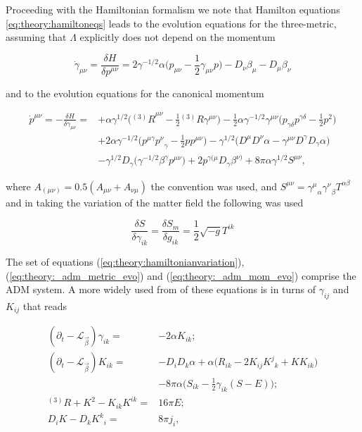 \documentclass[11pt,a4paper,headinclude=true,DIV=14,BCOR=8mm,chapterprefix,listof=totoc,twoside,openright,abstracton]{scrbook}
\begin{document}
Proceeding with the Hamiltonian formalism we note that Hamilton equations \ref{eq:theory:hamiltoneqs} leads to the evolution equations for the three-metric, assuming that $\Lambda$ explicitly does not depend on the momentum

\begin{equation}
\dot{\gamma}_{\mu\nu} =\frac{\delta H}{\delta p^{\mu\nu}} = 2\gamma^{-1/2}\alpha\big(p_{\mu\nu}-\frac{1}{2}\gamma_{\mu\nu}p\big) - D_{\nu}\beta_{\mu}-D_{\mu}\beta_{\nu}
\label{eq:theory:_adm_metric_evo}
\end{equation}

and to the evolution equations for the canonical momentum 

\begin{align}
\dot{p}^{\mu\nu} = -\frac{\delta H}{\delta \gamma_{\mu\nu}} = &+ \alpha\gamma^{1/2}\Big({^{(3)}R}^{\mu\nu}-\frac{1}{2}{^{(3)}R\gamma^{\mu\nu}}\Big) 
 - \frac{1}{2}\alpha\gamma^{-1/2}\gamma^{\mu\nu}\Big(p_{\gamma\delta}p^{\gamma\delta}-\frac{1}{2}p^2\Big) \\
& + 2\alpha\gamma^{-1/2}\big(p^{\mu\gamma}{p^{\nu}}_{\gamma}-\frac{1}{2}pp^{\mu\nu}\big) 
 - \gamma^{1/2}\big(D^{\mu}D^{\nu}\alpha-\gamma^{\mu\nu}D^{\gamma}D_{\gamma}\alpha\big) \\
& - \gamma^{1/2}D_{\gamma}\big(\gamma^{-1/2}\beta^{\gamma}p^{\mu\nu}\big) 
+ 2p^{\gamma(\mu}D_{\gamma}\beta^{\nu)} + 8\pi \alpha \gamma^{1/2}S^{\mu\nu},
\label{eq:theory:_adm_mom_evo}
\end{align}

where $A_{(\mu\nu)} = 0.5(A_{\mu\nu}+A_{\nu\mu})$ the convention was used, and $S^{\mu\nu} = {\gamma^{\mu}}_{\alpha}{\gamma^{\nu}}_{\beta}T^{\alpha\beta}$ and in taking the variation of the matter field the following was used

\begin{equation}
\frac{\delta S}{\delta \gamma_{ik}} = \frac{\delta S_m}{\delta g_{ik}} = \frac{1}{2}\sqrt{-g}T^{ik}
\end{equation}

The set of equations (\ref{eq:theory:hamiltonianvariation}), (\ref{eq:theory:_adm_metric_evo}) and (\ref{eq:theory:_adm_mom_evo}) comprise the ADM system. A more widely used from of these equations is in turns of $\gamma_{ij}$ and $K_{ij}$ that reads

\begin{align}
(\partial_t - \mathcal{L}_{\vec{\beta}})\gamma_{ik} =& -2\alpha K_{ik}; \\
(\partial_t - \mathcal{L}_{\vec{\beta}})K_{ik} =& -D_{i}D_{k}\alpha + \alpha\big(R_{ik} - 2K_{ij}{K^j}_k+KK_{ik}\big) \\
&- 8\pi\alpha\Big(S_{ik} - \frac{1}{2}\gamma_{ik}(S-E)\Big); \\
{^{(3)}R} + K^2 - K_{ik}K^{ik} =& 16\pi E; \\
D_{i}K-D_{k}{K^k}_i =& 8\pi j_i,
\label{eq:theory:adm}
\end{align}
\end{document}

